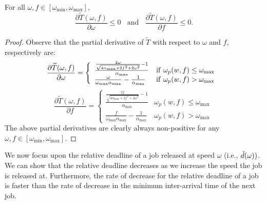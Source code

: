 \begin{property} \label{prop:neg-deriv-min-interarrival}
For all $\omega, f \in [\omega_{\min}, \omega_{\max}]$,
\begin{equation}\label{eqn:neg-deriv-min-interarrival}
\frac{\partial \widetilde{T}(\omega,f)}{\partial \omega} \leq 0~~~~ \textrm{and} ~~~~\frac{\partial \widetilde{T}(\omega,f)}{\partial f} \leq 0.
\end{equation}
\end{property}
\begin{proof}
Observe that the partial derivative of $\widetilde{T}$ with respect to $\omega$ and $f$, respectively are:
\begin{equation} \label{eq:minTimeDerivativeWrtInitial}
\frac{\partial \widetilde{T}(\omega,f)}{\partial \omega} =
\left\{
    \begin{array}{ll}
        \frac{\frac{2\omega}{\sqrt{4\alpha_{\max}+2f^2+2\omega^2}}-1}{\alpha_{\max}} & {\rm if}~ \omega_p(w,f) \leq \omega_{\max} \ \\
        \frac{\omega}{\omega_{\max}\alpha_{\max}} -\frac{1}{\alpha_{\max}}  & {\rm if}~ \omega_p(w,f) > \omega_{\max}
    \end{array}
\right.
\end{equation}
\begin{equation} \label{eq:minTimeDerivativeWrtFinal}
\frac{\partial \widetilde{T}(\omega,f)}{\partial f} =
\left\{
    \begin{array}{ll}
        \frac{\frac{2f}{\sqrt{4\alpha_{\max}+2f^2+2\omega^2}}-1}{\alpha_{\max}} & \omega_p(w,f) \leq \omega_{\max} \ \\
        \frac{f}{\omega_{\max}\alpha_{\max}} - \frac{1}{\alpha_{\max}}  & \omega_p(w,f) > \omega_{\max}
    \end{array}
\right.
\end{equation}
The above partial derivatives are clearly always non-positive for any $\omega, f \in [\omega_{\min}, \omega_{\max}]$.
\end{proof}

We now focus upon the relative deadline of a job released at speed $\omega$  (i.e., $\Tilde{d}(\omega))$.
 We can show that the relative deadline decreases as we increase the speed the job is released at.
 Furthermore, the rate of decrease for the relative deadline of a job is faster than the rate of decrease in the minimum inter-arrival time of the next job.

